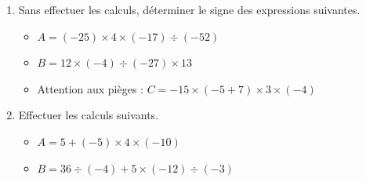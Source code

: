 \documentclass[a4paper]{book}
\begin{document}
    \begin{exemple}
        \begin{enumerate}
            \item Sans effectuer les calculs, déterminer le signe des expressions suivantes.
            \begin{itemize}
                \item $A=(-25)\times4\times(-17)\div(-52)$
                \item $B=12\times(-4)\div(-27)\times 13$
                \item Attention aux pièges : $C=-15\times(-5+7)\times3\times(-4)$
            \end{itemize}
        
            \item Effectuer les calculs suivants.
            \begin{itemize}
                \item $A=5+(-5)\times4\times(-10)$
                \item $B=36\div(-4)+5\times(-12)\div(-3)$
            \end{itemize}
        \end{enumerate}
    \end{exemple}


 
\end{document}
